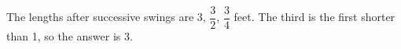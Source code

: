 The lengths after successive swings are 3, $\dfrac{3}{2}$, $\dfrac{3}{4}$ feet. The third is the first shorter than 1, so the answer is $\boxed3$.
